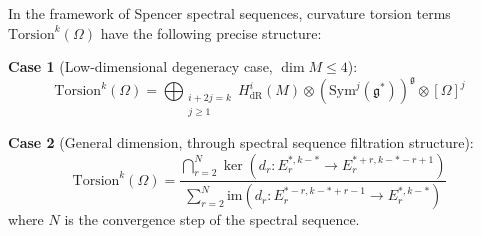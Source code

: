 \documentclass[10pt,a4paper]{amsart}
\begin{document}
\begin{theorem}
In the framework of Spencer spectral sequences, curvature torsion terms $\text{Torsion}^k(\Omega)$ have the following precise structure:

\textbf{Case 1} (Low-dimensional degeneracy case, $\dim M \leq 4$):
$$\text{Torsion}^k(\Omega) = \bigoplus_{\substack{i+2j=k \\ j \geq 1}} H^i_{\text{dR}}(M) \otimes (\text{Sym}^j(\mathfrak{g}^*))^\mathfrak{g} \otimes [\Omega]^j$$

\textbf{Case 2} (General dimension, through spectral sequence filtration structure):
$$\text{Torsion}^k(\Omega) = \frac{\bigcap_{r=2}^N \ker(d_r: E_r^{*,k-*} \to E_r^{*+r, k-*-r+1})}{\sum_{r=2}^N \text{im}(d_r: E_r^{*-r, k-*+r-1} \to E_r^{*,k-*})}$$
where $N$ is the convergence step of the spectral sequence.
\end{theorem}
\end{document}
